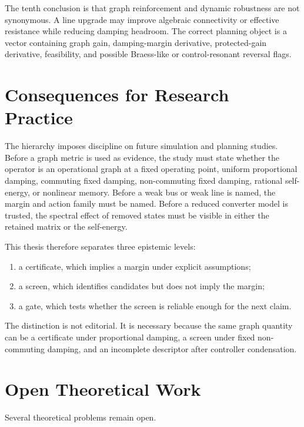 The tenth conclusion is that graph reinforcement and dynamic robustness are
not synonymous. A line upgrade may improve algebraic connectivity or effective
resistance while reducing damping headroom. The correct planning object is a
vector containing graph gain, damping-margin derivative, protected-gain
derivative, feasibility, and possible Braess-like or control-resonant reversal
flags.

\section{Consequences for Research Practice}

The hierarchy imposes discipline on future simulation and planning studies.
Before a graph metric is used as evidence, the study must state whether the
operator is an operational graph at a fixed operating point, uniform
proportional damping, commuting fixed damping, non-commuting fixed damping,
rational self-energy, or nonlinear memory. Before a weak bus or weak line is
named, the margin and action family must be named. Before a reduced converter
model is trusted, the spectral effect of removed states must be visible in
either the retained matrix or the self-energy.

This thesis therefore separates three epistemic levels:

\begin{enumerate}
\item a certificate, which implies a margin under explicit assumptions;
\item a screen, which identifies candidates but does not imply the margin;
\item a gate, which tests whether the screen is reliable enough for the next
claim.
\end{enumerate}

The distinction is not editorial. It is necessary because the same graph
quantity can be a certificate under proportional damping, a screen under fixed
non-commuting damping, and an incomplete descriptor after controller
condensation.

\section{Open Theoretical Work}

Several theoretical problems remain open.

